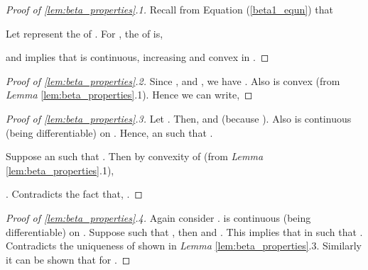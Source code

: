 \documentclass[onecolumn]{IEEEtran}
\begin{document}
 \noindent
 \begin{proof}[Proof of \ref{lem:beta_properties}.1]
 Recall from Equation (\ref{beta1_equn}) that 
 
 Let  represent the  of . For  , the  of  is,
 
 
   and  implies that  is continuous, increasing and convex in .
 \end{proof}
 \vspace{2mm}
 \begin{proof}[Proof of \ref{lem:beta_properties}.2]
 Since ,  and  , we have  . 
 Also  is convex (from \emph{Lemma} \ref{lem:beta_properties}.1). Hence we can write,
 
 \end{proof}
 \vspace{2mm}
 \begin{proof}[Proof of \ref{lem:beta_properties}.3]
   Let . Then,  and
    (because ). Also  is continuous (being differentiable) on
   . Hence,  an  such that
   .

 Suppose  an  such that
 . Then by convexity of 
 (from \emph{Lemma} \ref{lem:beta_properties}.1),
 
  . Contradicts the fact that, .
 \end{proof}
 \vspace{2mm}
 \begin{proof}[Proof of \ref{lem:beta_properties}.4]
   Again consider .  is continuous (being
   differentiable) on .  Suppose  
   such that , then  and . This implies that
     in  such that . Contradicts the
   uniqueness of  shown in \emph{Lemma} \ref{lem:beta_properties}.3.  Similarly
   it can be shown that  for .
 \end{proof}
\end{document}
